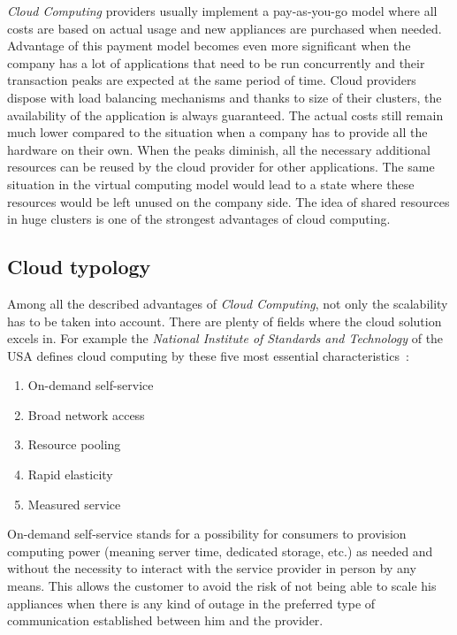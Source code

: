 \emph{Cloud Computing} providers usually implement a pay-as-you-go model where all costs are based on actual usage and new appliances are purchased when needed. Advantage of this payment model becomes even more significant when the company has a lot of applications that need to be run concurrently and their transaction peaks are expected at the same period of time. Cloud providers dispose with load balancing mechanisms and thanks to size of their clusters, the availability of the application is always guaranteed. The actual costs still remain much lower compared to the situation when a company has to provide all the hardware on their own. When the peaks diminish, all the necessary additional resources can be reused by the cloud provider for other applications. The same situation in the virtual computing model would lead to a state where these resources would be left unused on the company side. The idea of shared resources in huge clusters is one of the strongest advantages of cloud computing.

\subsection{Cloud typology}
\label{sub:Cloud typology}

Among all the described advantages of \emph{Cloud Computing}, not only the scalability has to be taken into account. There are plenty of fields where the cloud solution excels in. For example the \emph{National Institute of Standards and Technology} of the USA defines cloud computing by these five most essential characteristics~\cite{hu}:

\begin{enumerate}
	\item On-demand self-service
	\item Broad network access
	\item Resource pooling
	\item Rapid elasticity
	\item Measured service
\end{enumerate}

On-demand self-service stands for a possibility for consumers to provision computing power (meaning server time, dedicated storage, etc.) as needed and without the necessity to interact with the service provider in person by any means. This allows the customer to avoid the risk of not being able to scale his appliances when there is any kind of outage in the preferred type of communication established between him and the provider.

